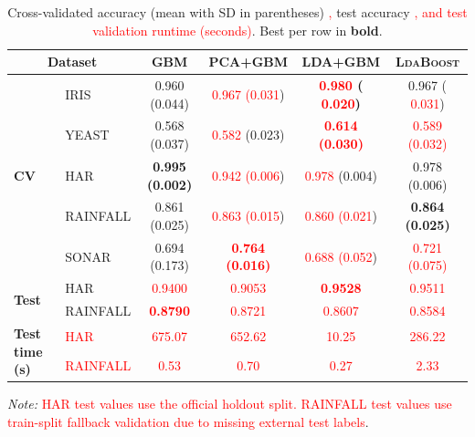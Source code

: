 \documentclass[11pt,a4paper]{article}
\providecommand{\DIFaddtex}[1]{\textcolor{red}{#1}} %
\providecommand{\DIFaddbegin}{} %
\providecommand{\DIFaddend}{} %
\providecommand{\DIFaddFL}[1]{\DIFadd{#1}} %
\providecommand{\DIFaddbeginFL}{\DIFaddbegin} %
\providecommand{\DIFaddendFL}{\DIFaddend} %
\providecommand{\DIFadd}[1]{\texorpdfstring{\DIFaddtex{#1}}{#1}} %
\begin{document}
\begin{table}[h!]
\centering
\begingroup
\setlength{\tabcolsep}{5pt}
\renewcommand{\arraystretch}{1.0}
\footnotesize
\caption{Cross-validated accuracy (mean with SD in parentheses) \DIFaddbeginFL \DIFaddFL{, }\DIFaddendFL test accuracy \DIFaddbeginFL \DIFaddFL{, and test validation runtime (seconds)}\DIFaddendFL .
Best per row in \textbf{bold}.}
\label{tab:classification_results}
\begin{tabular}{@{}llcccc@{}}
\toprule
\multicolumn{2}{c}{\textbf{Dataset}} & \textbf{GBM} & \textbf{PCA+GBM} & \textbf{LDA+GBM} & \textbf{\textsc{LdaBoost}} \\
\midrule
\multirow{5}{*}{\textbf{CV}} 
    & IRIS      & 0.960 (0.044) &  \DIFaddbeginFL \DIFaddFL{0.967 (0.031}\DIFaddendFL ) & \textbf{ \DIFaddbeginFL \DIFaddFL{0.980 }\DIFaddendFL ( \DIFaddbeginFL \DIFaddFL{0.020}\DIFaddendFL )} & 0.967 ( \DIFaddbeginFL \DIFaddFL{0.031}\DIFaddendFL ) \\
    & YEAST     & 0.568 (0.037) &  \DIFaddbeginFL \DIFaddFL{0.582 }\DIFaddendFL (0.023) &  \DIFaddbeginFL \DIFaddFL{\textbf{0.614 (0.030)} }\DIFaddendFL &  \DIFaddbeginFL \DIFaddFL{0.589 (0.032) }\DIFaddendFL \\
    & HAR       & \textbf{0.995 (0.002)} &  \DIFaddbeginFL \DIFaddFL{0.942 (0.006}\DIFaddendFL ) &  \DIFaddbeginFL \DIFaddFL{0.978 }\DIFaddendFL (0.004) & 0.978 (0.006) \\
    & RAINFALL  & 0.861 (0.025) &  \DIFaddbeginFL \DIFaddFL{0.863 (0.015}\DIFaddendFL ) &  \DIFaddbeginFL \DIFaddFL{0.860 (0.021}\DIFaddendFL ) & \textbf{0.864 (0.025)} \\
    & SONAR     & 0.694 (0.173) &  \DIFaddbeginFL \DIFaddFL{\textbf{0.764 (0.016)} }& \DIFaddFL{0.688 (0.052}\DIFaddendFL ) &  \DIFaddbeginFL \DIFaddFL{0.721 (0.075) }\DIFaddendFL \\
\midrule
\multirow{2}{*}{\textbf{Test}} 
    & HAR       &  \DIFaddbeginFL \DIFaddFL{0.9400 }\DIFaddendFL &  \DIFaddbeginFL \DIFaddFL{0.9053 }\DIFaddendFL & \textbf{ \DIFaddbeginFL \DIFaddFL{0.9528}\DIFaddendFL } &  \DIFaddbeginFL \DIFaddFL{0.9511 }\DIFaddendFL \\
    & RAINFALL  & \textbf{ \DIFaddbeginFL \DIFaddFL{0.8790}\DIFaddendFL } &  \DIFaddbeginFL \DIFaddFL{0.8721 }\DIFaddendFL &  \DIFaddbeginFL \DIFaddFL{0.8607 }\DIFaddendFL &  \DIFaddbeginFL \DIFaddFL{0.8584 }\DIFaddendFL \\
\DIFaddbeginFL \midrule
\multirow{2}{*}{\textbf{Test time (s)}} 
    & \DIFaddFL{HAR       }& \DIFaddFL{675.07 }& \DIFaddFL{652.62 }& \DIFaddFL{10.25 }& \DIFaddFL{286.22 }\\
    & \DIFaddFL{RAINFALL  }& \DIFaddFL{0.53 }& \DIFaddFL{0.70 }& \DIFaddFL{0.27 }& \DIFaddFL{2.33 }\\
\DIFaddendFL \bottomrule
\end{tabular}
\endgroup

\medskip
\raggedright\footnotesize
\textit{Note:}  \DIFaddbeginFL \DIFaddFL{HAR test values use the official holdout split. RAINFALL test values use train-split fallback validation due to missing external test labels}\DIFaddendFL .
\end{table}
\end{document}
